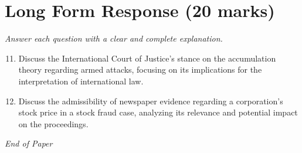 \documentclass[12pt]{article}
\begin{document}
\section*{Long Form Response (20 marks)}
\textit{Answer each question with a clear and complete explanation.}
\begin{enumerate}[label=\arabic*.]
\setcounter{enumi}{10}
\item Discuss the International Court of Justice's stance on the accumulation theory regarding armed attacks, focusing on its implications for the interpretation of international law.
\item Discuss the admissibility of newspaper evidence regarding a corporation's stock price in a stock fraud case, analyzing its relevance and potential impact on the proceedings.
\end{enumerate}

\vfill
\noindent\textit{End of Paper}
\end{document}

